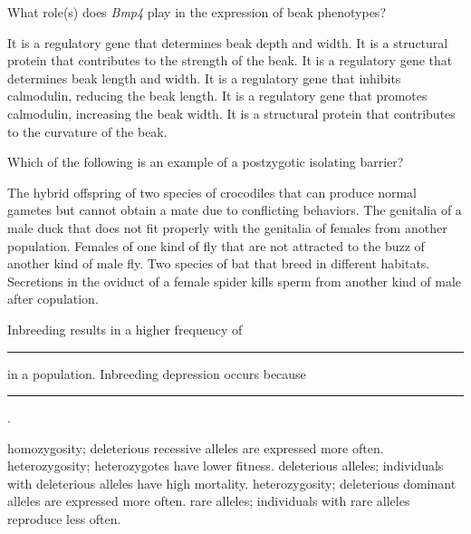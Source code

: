 \question
What role(s) does \textit{Bmp4} play in the expression of beak phenotypes?

\begin{choices}
\correctchoice  It is a regulatory gene that determines beak depth and width. %
\choice It is a structural protein that contributes to the strength of the beak.%
\choice It is a regulatory gene that determines beak length and width. %
\choice It is a regulatory gene that inhibits calmodulin, reducing the beak length. %
\choice It is a regulatory gene that promotes calmodulin, increasing the beak width. %
\choice It is a structural protein that contributes to the curvature of the beak. %
\end{choices}


\question
Which of the following is an example of a postzygotic isolating barrier?

\begin{choices}
\correctchoice The hybrid offspring of two species of crocodiles that can produce normal gametes but cannot obtain a mate due to conflicting behaviors. %
\choice The genitalia of a male duck that does not fit properly with the genitalia of females from another population. %
\choice Females of one kind of fly that are not attracted to the buzz of another kind of male fly. %
\choice Two species of bat that breed in different habitats.%
\choice Secretions in the oviduct of a female spider kills sperm from another kind of male after copulation.  %
\end{choices}

\question
Inbreeding results in a higher frequency of \rule{1in}{0.4pt} in a population.  Inbreeding depression occurs because \rule{1in}{0.4pt}.

\begin{choices}
\correctchoice homozygosity; deleterious recessive alleles are expressed more often. %
\choice heterozygosity; heterozygotes have lower fitness. %
\choice deleterious alleles; individuals with deleterious alleles have high mortality. %
\choice heterozygosity; deleterious dominant alleles are expressed more often. %
\choice rare alleles; individuals with rare alleles reproduce less often. %
\end{choices}
